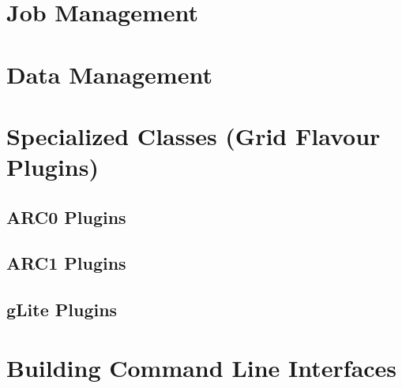 \documentclass{book}
\begin{document}
\chapter{Job Management}
\label{sec:JobManagement}

\chapter{Data Management}
\label{sec:DataManagement}

\chapter{Specialized Classes (Grid Flavour Plugins)}
\label{sec:plugins}
\section{ARC0 Plugins}
\section{ARC1 Plugins}
\section{gLite Plugins}

\chapter{Building Command Line Interfaces}
\label{sec:cli}


\end{document}
